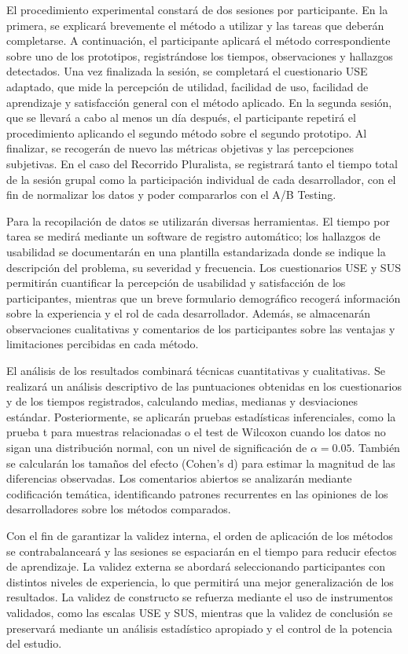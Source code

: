 \documentclass[a4paper,12pt]{report}
\begin{document}
El procedimiento experimental constará de dos sesiones por participante. En la primera, se explicará brevemente el método a utilizar y las tareas que deberán completarse. A continuación, el participante aplicará el método correspondiente sobre uno de los prototipos, registrándose los tiempos, observaciones y hallazgos detectados. Una vez finalizada la sesión, se completará el cuestionario USE adaptado, que mide la percepción de utilidad, facilidad de uso, facilidad de aprendizaje y satisfacción general con el método aplicado. En la segunda sesión, que se llevará a cabo al menos un día después, el participante repetirá el procedimiento aplicando el segundo método sobre el segundo prototipo. Al finalizar, se recogerán de nuevo las métricas objetivas y las percepciones subjetivas. En el caso del Recorrido Pluralista, se registrará tanto el tiempo total de la sesión grupal como la participación individual de cada desarrollador, con el fin de normalizar los datos y poder compararlos con el A/B Testing.

Para la recopilación de datos se utilizarán diversas herramientas. El tiempo por tarea se medirá mediante un software de registro automático; los hallazgos de usabilidad se documentarán en una plantilla estandarizada donde se indique la descripción del problema, su severidad y frecuencia. Los cuestionarios USE y SUS permitirán cuantificar la percepción de usabilidad y satisfacción de los participantes, mientras que un breve formulario demográfico recogerá información sobre la experiencia y el rol de cada desarrollador. Además, se almacenarán observaciones cualitativas y comentarios de los participantes sobre las ventajas y limitaciones percibidas en cada método.

El análisis de los resultados combinará técnicas cuantitativas y cualitativas. Se realizará un análisis descriptivo de las puntuaciones obtenidas en los cuestionarios y de los tiempos registrados, calculando medias, medianas y desviaciones estándar. Posteriormente, se aplicarán pruebas estadísticas inferenciales, como la prueba t para muestras relacionadas o el test de Wilcoxon cuando los datos no sigan una distribución normal, con un nivel de significación de $\alpha = 0.05$. También se calcularán los tamaños del efecto (Cohen’s d) para estimar la magnitud de las diferencias observadas. Los comentarios abiertos se analizarán mediante codificación temática, identificando patrones recurrentes en las opiniones de los desarrolladores sobre los métodos comparados.

Con el fin de garantizar la validez interna, el orden de aplicación de los métodos se contrabalanceará y las sesiones se espaciarán en el tiempo para reducir efectos de aprendizaje. La validez externa se abordará seleccionando participantes con distintos niveles de experiencia, lo que permitirá una mejor generalización de los resultados. La validez de constructo se refuerza mediante el uso de instrumentos validados, como las escalas USE y SUS, mientras que la validez de conclusión se preservará mediante un análisis estadístico apropiado y el control de la potencia del estudio. 
\end{document}
